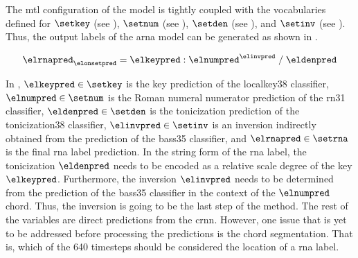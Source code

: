 
The \gls{mtl} configuration of the model is tightly coupled
with the vocabularies defined for $\setkey$ (see
), $\setnum$ (see
), $\setden$
(see ), and
$\setinv$ (see
). Thus, the
output labels of the \gls{arna} model can be generated as
shown in . 

\begin{equation}
    \label{eq:rna_pred}
    \elrnapred_{\elonsetpred} = \elkeypred : \elnumpred^{\elinvpred} \; / \; \eldenpred
\end{equation}

In , $\elkeypred \in \setkey$ is the key
prediction of the \gls{localkey38} classifier, $\elnumpred
\in \setnum$ is the Roman numeral numerator prediction of
the \gls{rn31} classifier, $\eldenpred \in \setden$ is the
tonicization prediction of the \gls{tonicization38}
classifier, $\elinvpred \in \setinv$ is an inversion
indirectly obtained from the prediction of the \gls{bass35}
classifier, and $\elrnapred \in \setrna$ is the final
\gls{rna} label prediction. In the string form of the
\gls{rna} label, the tonicization $\eldenpred$ needs to be
encoded as a relative scale degree of the key $\elkeypred$.
Furthermore, the inversion $\elinvpred$ needs to be
determined from the prediction of the \gls{bass35}
classifier in the context of the $\elnumpred$ chord. Thus,
the inversion is going to be the last step of the method.
The rest of the variables are direct predictions from the
\gls{crnn}. However, one issue that is yet to be addressed
before processing the predictions is the chord segmentation.
That is, which of the 640 timesteps should be considered the
location of a \gls{rna} label. 

